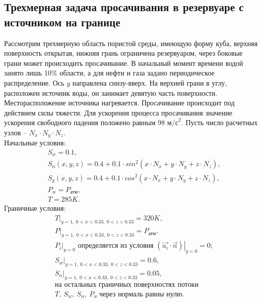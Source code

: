 
\subsection{Трехмерная задача просачивания в резервуаре с источником на границе}

Рассмотрим трехмерную область пористой среды, имеющую форму
куба, верхняя поверхность открытая, нижняя грань ограничена резервуаром, через боковые грани
может происходить просачивание.
В начальный момент времени водой занято лишь
10\% области, а для нефти и газа задано периодическое распределение. Ось $y$ направлена снизу-вверх.
На верхней грани в углу, расположен источник воды, он занимает девятую часть поверхности.
Месторасположение источника нагревается.
Просачивание происходит под действием силы тяжести. 
Для ускорения процесса просачивания значение ускорения свободного падения положено равным 98 $\text{м/с}^2$.
Пусть число расчетных узлов -- $N_x\cdot N_y\cdot N_z$.\\
Начальные условия:
\begin{equation}
  \begin{aligned}
    &S_w=0.1,\\
    &S_n(x, y, z)=0.4 + 0.1 \cdot sin^2(x \cdot N_x + y \cdot N_y + z \cdot N_z),\\
    &S_g(x, y, z)=0.4 + 0.1 \cdot cos^2(x \cdot N_x + y \cdot N_y + z \cdot N_z),\\
    &P_w=P_\text{атм},\\
    &T=285K.
   \end{aligned}
\end{equation}
Граничные условия:
\begin{equation}
  \begin{aligned}
    &\left.T\right|_{y=1,\ 0 < x < 0.33,\ 0 < z < 0.33}=320K,\\
    &\left.P\right|_{y=1,\ 0 < x < 0.33,\ 0 < z < 0.33}=P_{\text{атм}},\\
    &\left.{P_i}\right|_{y=0}\text{ определяется из условия } \left.(\overrightarrow{u_i} \cdot \overrightarrow{n})\right|_{y=0}=0;\\
    &\left.S_w\right|_{y=1,\ 0 < x < 0.33,\ 0 < z < 0.33}=0.6,\\
    &\left.S_n\right|_{y=1,\ 0 < x < 0.33,\ 0 < z < 0.33}=0.05,\\
    &\text{на остальных граничных поверхностях потоки}\\
    &T,\ S_w,\ S_n,\ P_w\ \text{через нормаль равны нулю.}
  \end{aligned}
\end{equation}

